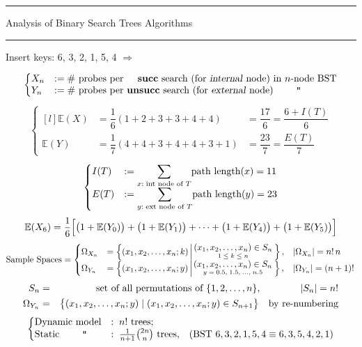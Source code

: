 \documentclass[11pt,fleqn]{article}
\newcommand{\CourseLogo}{
\hrule\begin{center}
\textsf{Analysis of Binary Search Trees Algorithms}
\end{center}\hrule \bigskip\bigskip 
}
\begin{document}
\CourseLogo

Insert keys: 6, 3, 2, 1, 5, 4 $\Rightarrow$



\begin{align*}
	\left\{\begin{matrix*}[l]
		X_n &:= \hbox{\# probes per \phantom{un}{\bf succ} search 
		(for {\sl internal\/} node) in $n$-node BST} \\
		Y_n &:= \hbox{\# probes per {\bf unsucc} search 
		(for {\sl external\/} node)\qquad\ {\tt "}}
	\end{matrix*}\right.
\end{align*}
\begin{align*}
	\left\{\begin{matrix*}[l]
	\mathbb{E}(X) &=\dfrac{1}{6} \left(1+2+3+3+4+4\right) &= \dfrac{17}{6} = \dfrac{6+I(T)}{6} \\
	\mathbb{E}(Y) &=\dfrac{1}{7} \left(4+4+3+4+4+3+1\right) &= \dfrac{23}{7} =\dfrac{E(T)}{7}
	\end{matrix*}\right.
\end{align*}
\begin{align*}
	\left\{\begin{matrix*}[l]
		I(T) &:= \mathlarger{\sum}\limits_{x :\;\text{int node of } T} \text{path length}(x) = 11\\
		E(T) &:= \mathlarger{\sum}\limits_{y :\;\text{ext node of } T} \text{path length}(y) = 23
	\end{matrix*}\right.
\end{align*}
\[
\mathbb{E}(X_6)={1\over6}
\Bigl[
 \bigl(1+\mathbb{E}(Y_0)\bigr)
+\bigl(1+\mathbb{E}(Y_1)\bigr)
+\cdots
+\bigl(1+\mathbb{E}(Y_4)\bigr)
+\bigl(1+\mathbb{E}(Y_5)\bigr)
\Bigr]
\]
\begin{align*}
	\text{Sample Spaces} = \left\{\begin{matrix*}[l]
		\Omega_{X_n} &= \left\{(x_1, x_2, \ldots, x_n; k) 
			\left|{\displaystyle
				(x_1, x_2, \ldots, x_n) \in S_n \atop
				1\; \le\; k\; \le\; n
			}\right. 
		\right\}, & |\Omega_{X_n}| = n!\,n \\
		\Omega_{Y_n} &= \left\{(x_1, x_2, \ldots, x_n; y)
	   		\left|{\displaystyle	
				(x_1, x_2, \ldots, x_n) \in S_n \atop
				y\; =\; 0.5, \; 1.5, \; \ldots, \; n.5
			}\right.
		\right\}, & |\Omega_{Y_n}| = (n+1)!
	\end{matrix*}\right. 
\end{align*}
\begin{eqnarray*}
S_n&=&\hbox{set of all permutations of }\{1,2,\ldots,n\},
\qquad\qquad|S_n| = n!\\
\Omega_{Y_n}&=& \bigl\{(x_1, x_2, \ldots, x_n; y)
	   		\;|\;(x_1, x_2, \ldots, x_n; y) \in S_{n+1}\bigr\}
	   		\quad \hbox{by re-numbering}	   		
\end{eqnarray*}
\begin{align*}
	\left\{\begin{matrix*}[l]
		\hbox{Dynamic model}&:\; n!\hbox{ trees;} \\
		\hbox{Static\qquad\ {\tt "}}&:\; \frac{1}{n+1}{2n\choose n}\hbox{ trees,\quad (BST $6,3,2,1,5,4\equiv 6,3,5,4,2,1$)}
	\end{matrix*}\right.
\end{align*}
\end{document}
